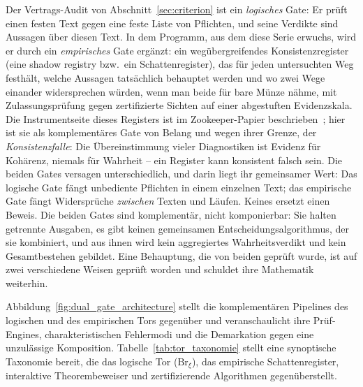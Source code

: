 \documentclass[11pt,a4paper]{article}
\begin{document}
Der Vertrags-Audit von Abschnitt~\ref{sec:criterion} ist ein
\emph{logisches} Gate: Er prüft einen festen Text gegen eine feste Liste von
Pflichten, und seine Verdikte sind Aussagen über diesen Text. In dem
Programm, aus dem diese Serie erwuchs, wird er durch ein \emph{empirisches}
Gate ergänzt: ein wegübergreifendes Konsistenzregister (eine \glqq shadow
registry\grqq{} bzw.\ ein Schattenregister), das für jeden untersuchten Weg festhält, welche Aussagen
tatsächlich behauptet werden und wo zwei Wege einander widersprechen würden,
wenn man beide für bare Münze nähme, mit Zulassungsprüfung gegen zertifizierte
Sichten auf einer abgestuften Evidenzskala. Die Instrumentseite dieses
Registers ist im Zookeeper-Papier beschrieben~\cite{zookeeper}; hier ist sie
als komplementäres Gate von Belang und wegen ihrer Grenze, der
\emph{Konsistenzfalle}: Die Übereinstimmung vieler Diagnostiken ist Evidenz
für Kohärenz, niemals für Wahrheit -- ein Register kann konsistent falsch
sein. Die beiden Gates versagen unterschiedlich, und darin liegt ihr
gemeinsamer Wert: Das logische Gate fängt unbediente Pflichten in einem
einzelnen Text; das empirische Gate fängt Widersprüche \emph{zwischen} Texten
und Läufen. Keines ersetzt einen Beweis. Die beiden Gates sind komplementär,
nicht komponierbar: Sie halten getrennte Ausgaben, es gibt keinen gemeinsamen
Entscheidungsalgorithmus, der sie kombiniert, und aus ihnen wird kein
aggregiertes Wahrheitsverdikt und kein Gesamtbestehen gebildet. Eine
Behauptung, die von beiden geprüft wurde, ist auf zwei verschiedene Weisen
geprüft worden und schuldet ihre Mathematik weiterhin.

Abbildung~\ref{fig:dual_gate_architecture} stellt die komplementären Pipelines des logischen und des empirischen Tors gegenüber und veranschaulicht ihre Prüf-Engines, charakteristischen Fehlermodi und die Demarkation gegen eine unzulässige Komposition. Tabelle~\ref{tab:tor_taxonomie} stellt eine synoptische Taxonomie bereit, die das logische Tor ($\mathrm{Br}_\xi$), das empirische Schattenregister, interaktive Theorembeweiser und zertifizierende Algorithmen gegenüberstellt.
\end{document}
